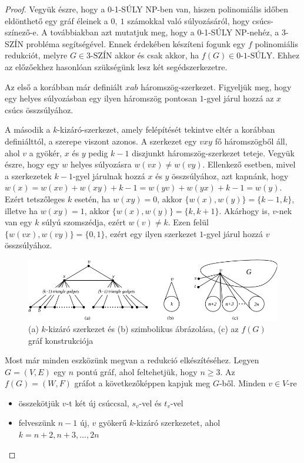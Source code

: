 \documentclass[12pt, a4paper]{report}
\theoremstyle{remark}
\theoremstyle{definition}
\begin{document}
\begin{proof}
Vegyük észre, hogy a 0-1-SÚLY NP-ben van, hiszen polinomiális időben eldönthető egy gráf éleinek a $0,\ 1$ számokkal való súlyozásáról, hogy csúcs-színező-e. A továbbiakban azt mutatjuk meg, hogy a 0-1-SÚLY NP-nehéz, a 3-SZÍN probléma segítségével. Ennek érdekében készíteni fogunk egy $f$ polinomiális redukciót, melyre $G \in \textrm{3-SZÍN}$ akkor és csak akkor, ha $f(G) \in \textrm{0-1-SÚLY}$. Ehhez az előzőekhez hasonlóan szükségünk lesz két segédszerkezetre.

Az első a korábban már definiált $xab$ háromszög-szerkezet. Figyeljük meg, hogy egy helyes súlyozásban egy ilyen háromszög pontosan $1$-gyel járul hozzá az $x$ csúcs összsúlyához. 

A második a $k$-kizáró-szerkezet, amely felépítését tekintve eltér a korábban definiálttól, a szerepe viszont azonos. A szerkezet egy $vxy$ fő háromszögből áll, ahol $v$ a gyökér, $x$ és $y$ pedig $k - 1$ diszjunkt háromszög-szerkezet teteje. Vegyük észre, hogy egy $w$ helyes súlyozásra $w(vx) \neq w(vy)$. Ellenkező esetben, mivel a szerkezetek $k - 1$-gyel járulnak hozzá $x$ és $y$ összsúlyához, azt kapnánk, hogy $w(x) = w(xv) + w(xy) + k - 1 = w(yv) + w(yx) + k - 1 = w(y)$. Ezért tetszőleges $k$ esetén, ha $w(xy) = 0$, akkor $\lbrace w(x), w(y) \rbrace = \lbrace k - 1, k \rbrace$, illetve ha $w(xy) = 1$, akkor $\lbrace w(x), w(y) \rbrace = \lbrace k, k + 1 \rbrace$. Akárhogy is, $v$-nek van egy $k$ súlyú szomszédja, ezért $w(v) \neq k$. Ezen felül $\lbrace w(vx), w(vy) \rbrace = \lbrace 0, 1 \rbrace$, ezért egy ilyen szerkezet $1$-gyel járul hozzá $v$ összsúlyához.

\begin{figure}[!h]
\centering
\includegraphics[width=\linewidth]{./images/gadgets01}
\caption{(a) $k$-kizáró szerkezet és (b) szimbolikus ábrázolása, (c) az $f(G)$ gráf konstrukciója}
\label{fig:gadgets01}
\end{figure}

Most már minden eszközünk megvan a redukció elkészítéséhez. Legyen $G = (V, E)$ egy $n$ pontú gráf, ahol feltehetjük, hogy $n \geq 3$. Az $f(G) = (W, F)$ gráfot a következőképpen kapjuk meg $G$-ből. Minden $v \in V$-re
\begin{itemize}
\item összekötjük $v$-t két új csúccsal, $s_v$-vel és $t_v$-vel
\item felveszünk $n - 1$ új, $v$ gyökerű $k$-kizáró szerkezetet, ahol $k = n + 2, n + 3, \ldots, 2n$
\end{itemize}


\end{proof}
\end{document}

